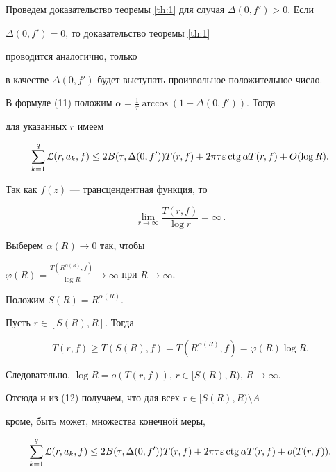 Проведем доказательство теоремы \ref{th:1} для случая $\Delta(0,f')>0$. Если


$\Delta(0,f')=0$, то доказательство теоремы \ref{th:1}


проводится аналогично, только 


в качестве $\Delta(0,f')$ будет выступать произвольное положительное число.


В формуле (11) положим $\alpha=\frac{1}{\tau}\arccos(1-\Delta(0,f'))$. Тогда


для указанных $r$ имеем


\begin{equation}


\sum\limits_{k=1}^{q}{\cal L}(r,a_k,f)\le


2B(\tau,\Delta(0,f'))T(r,f)+2\pi\tau\varepsilon\ctg \alpha T(r,f)


+O(\log R).


\end{equation}





Так как $f(z)$ --- трансцендентная функция, то


$$


\lim\limits_{r \to \infty}\frac{T(r,f)}{\log r}=\infty\,.


$$


Выберем $\alpha(R)\to 0$ так, чтобы


$\varphi(R)=\frac{T(R^{\alpha(R)},f)}{\log R}\to \infty$ при $R \to


\infty$. 


Положим $S(R)=R^{\alpha(R)}$.


Пусть $r\in [S(R),R]$. Тогда


$$


T(r,f)\ge T(S(R),f)=T(R^{\alpha(R)},f)=\varphi(R)\log R.


$$


Следовательно, $\log R=o(T(r,f))$, $r\in [S(R),R)$, $R\to\infty$.


Отсюда и из (12) получаем, что для всех $r\in [S(R),R)\setminus A$


кроме, быть может, множества конечной меры,


\begin{equation}


\sum\limits_{k=1}^{q}{\cal L}(r,a_k,f)\le


2B(\tau,\Delta(0,f'))T(r,f)+2\pi\tau\varepsilon\ctg\alpha T(r,f)


+o(T(r,f)).


\end{equation}


